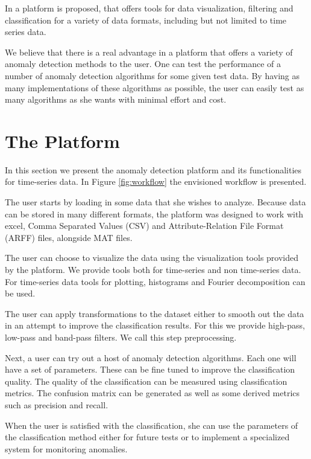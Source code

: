 \documentclass[a4paper, 10pt]{article}
\begin{document}
In \cite{tpad2018} a platform is proposed, that offers tools for data visualization, filtering and classification for a variety of data formats, including but not limited to time series data.

We believe that there is a real advantage in a platform that offers a variety of anomaly detection methods to the user. One can test the performance of a number of anomaly detection algorithms for some given test data. By having as many implementations of these algorithms as possible, the user can easily test as many algorithms as she wants with minimal effort and cost.

\section{The Platform \label{platform}}
 
In this section we present the anomaly detection platform and its functionalities for time-series data. In Figure \ref{fig:workflow} the envisioned workflow is presented. 

The user starts by loading in some data that she wishes to analyze. Because data can be stored in many different formats, the platform was designed to work with excel, Comma Separated Values (CSV) and Attribute-Relation File Format (ARFF) files, alongside MAT files. 

The user can choose to visualize the data using the visualization tools provided by the platform. We provide tools both for time-series and non time-series data. For time-series data tools for plotting, histograms and Fourier decomposition can be used.

The user can apply transformations to the dataset either to smooth out the data in an attempt to improve the classification results. For this we provide high-pass, low-pass and band-pass filters. We call this step preprocessing.

Next, a user can try out a host of anomaly detection algorithms. Each one will have a set of parameters. These can be fine tuned to improve the classification quality. The quality of the classification can be measured using classification metrics. The confusion matrix can be generated as well as some derived metrics such as precision and recall.

When the user is satisfied with the classification, she can use the parameters of the classification method either for future tests or to implement a specialized system for monitoring anomalies.
\end{document}
